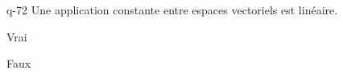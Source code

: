 \begin{truefalse}{q-72}
Une application constante entre espaces vectoriels est linéaire.
\item Vrai
\item* Faux
\end{truefalse}

